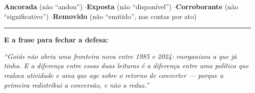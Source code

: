 \textbf{Ancorada} (não ``andou'') \quad$\cdot$\quad \textbf{Exposta} (não
``disponível'') \quad$\cdot$\quad \textbf{Corroborante} (não ``significativo'')
\quad$\cdot$\quad \textbf{Removido} (não ``emitido'', nas contas por ato)

\vspace{14pt}
{\color{corregra}\rule{\textwidth}{0.8pt}}

\vspace{6pt}
{\color{cortinta}\bfseries E a frase para fechar a defesa:}

\vspace{2pt}
\emph{``Goiás não abriu uma fronteira nova entre 1985 e 2024: reorganizou a que
já tinha. E a diferença entre essas duas leituras é a diferença entre uma
política que realoca atividade e uma que age sobre o retorno de converter ---
porque a primeira redistribui a conversão, e não a reduz.''}
